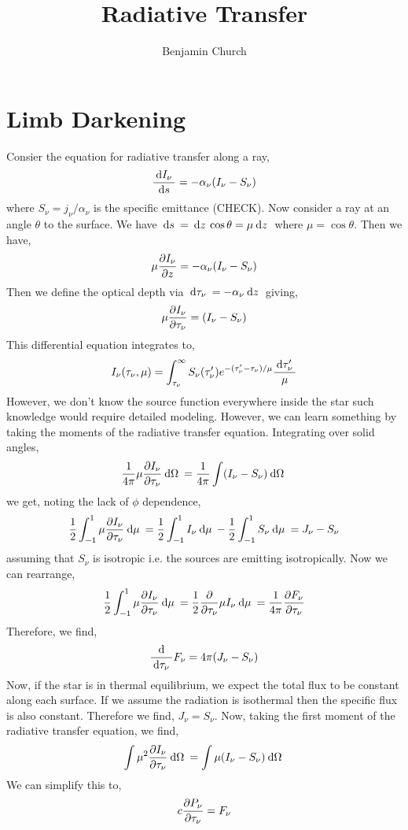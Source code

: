 \documentclass[11pt, a4paper]{article}
\begin{document}
\author{Benjamin Church}
\title{\Huge Radiative Transfer}


\maketitle
\tableofcontents
\newpage

\section{Limb Darkening}

Consier the equation for radiative transfer along a ray,
\[ \frac{\: \mathrm{d}I_\nu \:}{\: \mathrm{d}s \:} = - \alpha_\nu (I_\nu - S_\nu) \]
where $S_\nu = j_\nu / \alpha_\nu$ is the specific emittance (CHECK).
Now consider a ray at an angle $\theta$ to the surface. We have $\: \mathrm{d}s \: = \: \mathrm{d}z \: \cos{\theta} = \mu \: \mathrm{d}z \:$ where $\mu = \cos{\theta}$. Then we have,
\[ \mu \frac{\partial{I_\nu}}{\partial{z}} = - \alpha_\nu (I_\nu - S_\nu) \]
Then we define the optical depth via $\: \mathrm{d}\tau_\nu \: = - \alpha_\nu \: \mathrm{d}z \:$ 
giving,
\[ \mu \frac{\partial{I_\nu}}{\partial{\tau_\nu}} = (I_\nu - S_\nu) \]
This differential equation integrates to,
\[ I_\nu(\tau_\nu, \mu) = \int_{\tau_\nu}^\infty S_\nu(\tau_\nu') e^{-(\tau_\nu' - \tau_\nu) / \mu} \frac{\: \mathrm{d}\tau_\nu' \:}{\mu} \]
However, we don't know the source function everywhere inside the star such knowledge would require detailed modeling. However, we can learn something by taking the moments of the radiative transfer equation. Integrating over solid angles,
\[ \frac{1}{4 \pi} \mu \frac{\partial{I_\nu}}{\partial{\tau_\nu}} \: \mathrm{d}\Omega \: = \frac{1}{4 \pi} \int (I_\nu - S_\nu) \: \mathrm{d}\Omega \: \]
we get, noting the lack of $\phi$ dependence,
\[ \frac{1}{2} \int_{-1}^1 \mu \frac{\partial{I_\nu}}{\partial{\tau_\nu}} \: \mathrm{d}\mu \: = \frac{1}{2} \int_{-1}^1 I_\nu \: \mathrm{d}\mu \:  - \frac{1}{2} \int^1_{-1} S_\nu \: \mathrm{d}\mu \: = J_\nu - S_\nu \]
assuming that $S_\nu$ is isotropic i.e. the sources are emitting isotropically. Now we can rearrange,
\[ \frac{1}{2} \int_{-1}^1 \mu \frac{\partial{I_\nu}}{\partial{\tau_\nu}} \: \mathrm{d}\mu \: = \frac{1}{2} \frac{\partial{}}{\partial{\tau_\nu}} \mu I_\nu \: \mathrm{d}\mu \: = \frac{1}{4 \pi} \frac{\partial{F_\nu}}{\partial{\tau_\nu}} \] 
Therefore, we find,
\[ \frac{\: \mathrm{d} \:}{\: \mathrm{d}\tau_\nu \:} F_{\nu} = 4 \pi ( J_\nu - S_\nu) \]
Now, if the star is in thermal equilibrium, we expect the total flux to be constant along each surface. If we assume the radiation is isothermal then the specific flux is also constant. Therefore we find, $J_\nu = S_\nu$. 
Now, taking the first moment of the radiative transfer equation, we find,
\[ \int \mu^2 \frac{\partial{I_\nu}}{\partial{\tau_\nu}} \: \mathrm{d}\Omega \: = \int \mu (I_\nu - S_\nu) \: \mathrm{d}\Omega \: \]
We can simplify this to,
\[ c \frac{\partial{P_\nu}}{\partial{\tau_\nu}} = F_\nu  \]
\end{document}
